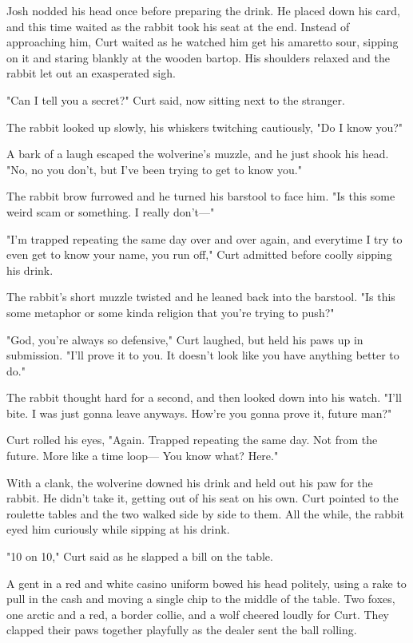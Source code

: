 Josh nodded his head once before preparing the drink. He placed down his card, and this time waited as the rabbit took his seat at the end. Instead of approaching him, Curt waited as he watched him get his amaretto sour, sipping on it and staring blankly at the wooden bartop. His shoulders relaxed and the rabbit let out an exasperated sigh.

"Can I tell you a secret?" Curt said, now sitting next to the stranger.

The rabbit looked up slowly, his whiskers twitching cautiously, "Do I know you?"

A bark of a laugh escaped the wolverine's muzzle, and he just shook his head. "No, no you don't, but I've been trying to get to know you."

The rabbit brow furrowed and he turned his barstool to face him. "Is this some weird scam or something. I really don't---"

"I'm trapped repeating the same day over and over again, and everytime I try to even get to know your name, you run off," Curt admitted before coolly sipping his drink.

The rabbit's short muzzle twisted and he leaned back into the barstool. "Is this some metaphor or some kinda religion that you're trying to push?"

"God, you're always so defensive," Curt laughed, but held his paws up in submission. "I'll prove it to you. It doesn't look like you have anything better to do."

The rabbit thought hard for a second, and then looked down into his watch. "I'll bite. I was just gonna leave anyways. How're you gonna prove it, future man?"

Curt rolled his eyes, "Again. Trapped repeating the same day. Not from the future. More like a time loop--- You know what? Here."

With a clank, the wolverine downed his drink and held out his paw for the rabbit. He didn't take it, getting out of his seat on his own. Curt pointed to the roulette tables and the two walked side by side to them. All the while, the rabbit eyed him curiously while sipping at his drink.

"10 on 10," Curt said as he slapped a bill on the table.

A gent in a red and white casino uniform bowed his head politely, using a rake to pull in the cash and moving a single chip to the middle of the table. Two foxes, one arctic and a red, a border collie, and a wolf cheered loudly for Curt. They clapped their paws together playfully as the dealer sent the ball rolling.

